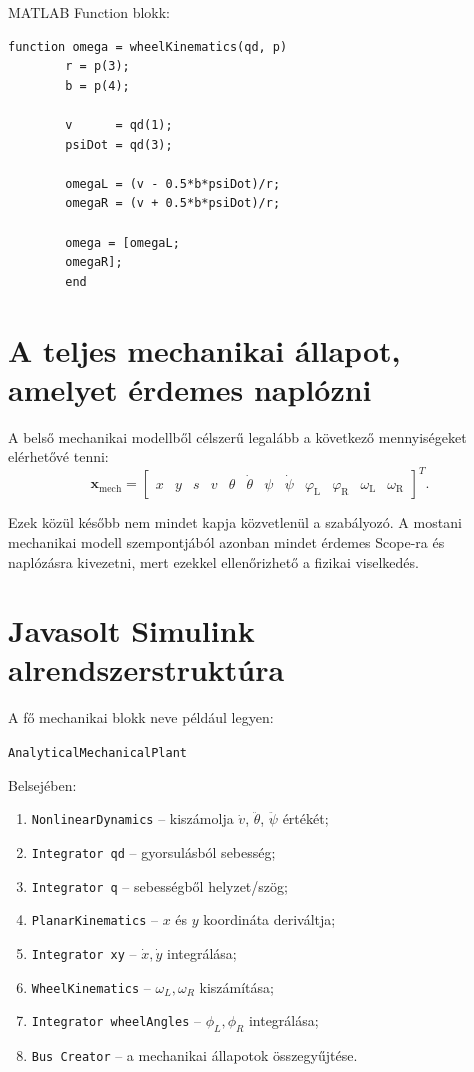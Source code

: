 \documentclass[12pt,a4paper]{article}
\newcommand{\phiL}{\varphi_{\mathrm{L}}}
\newcommand{\phiR}{\varphi_{\mathrm{R}}}
\newcommand{\omegaL}{\omega_{\mathrm{L}}}
\newcommand{\omegaR}{\omega_{\mathrm{R}}}
\begin{document}
	MATLAB Function blokk:
	\begin{lstlisting}[style=matlab]
		function omega = wheelKinematics(qd, p)
		r = p(3);
		b = p(4);
		
		v      = qd(1);
		psiDot = qd(3);
		
		omegaL = (v - 0.5*b*psiDot)/r;
		omegaR = (v + 0.5*b*psiDot)/r;
		
		omega = [omegaL;
		omegaR];
		end
	\end{lstlisting}
	
	\section{A teljes mechanikai állapot, amelyet érdemes naplózni}
	
	A belső mechanikai modellből célszerű legalább a következő mennyiségeket elérhetővé tenni:
	\begin{equation}
		\bm x_{\mathrm{mech}}=
		\begin{bmatrix}
			x & y & s & v & \theta & \dot\theta & \psi & \dot\psi &
			\phiL & \phiR & \omegaL & \omegaR
		\end{bmatrix}^{\!T}.
	\end{equation}
	
	Ezek közül később nem mindet kapja közvetlenül a szabályozó. A mostani mechanikai modell szempontjából azonban mindet érdemes Scope-ra és naplózásra kivezetni, mert ezekkel ellenőrizhető a fizikai viselkedés.
	
	\section{Javasolt Simulink alrendszerstruktúra}
	
	A fő mechanikai blokk neve például legyen:
	\begin{center}
		\texttt{AnalyticalMechanicalPlant}
	\end{center}
	
	Belsejében:
	\begin{enumerate}[leftmargin=2em]
		\item \texttt{NonlinearDynamics} -- kiszámolja $\dot v$, $\ddot\theta$, $\ddot\psi$ értékét;
		\item \texttt{Integrator qd} -- gyorsulásból sebesség;
		\item \texttt{Integrator q} -- sebességből helyzet/szög;
		\item \texttt{PlanarKinematics} -- $x$ és $y$ koordináta deriváltja;
		\item \texttt{Integrator xy} -- $\dot x,\dot y$ integrálása;
		\item \texttt{WheelKinematics} -- $\omega_L,\omega_R$ kiszámítása;
		\item \texttt{Integrator wheelAngles} -- $\phi_L,\phi_R$ integrálása;
		\item \texttt{Bus Creator} -- a mechanikai állapotok összegyűjtése.
	\end{enumerate}
	
\end{document}
